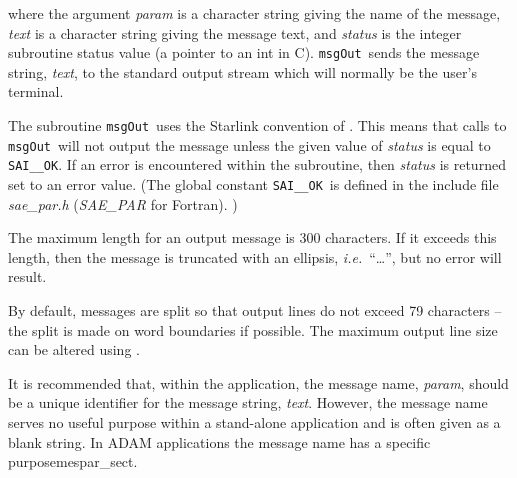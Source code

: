 \documentclass[twoside,11pt]{starlink}
\providecommand{\func}[1]{\texttt{#1}}
\providecommand{\farg}[1]{\textit{#1}}
\providecommand{\const}[1]{\texttt{#1}}
\providecommand{\fname}[1]{\textit{#1}}
\providecommand{\saiok}{\const{SAI\_\_OK}}
\providecommand{\msgout}{\func{msgOut}}
\begin{document}
where the argument \farg{param} is a character string giving the name of the message,
\farg{text} is a character string giving the message text, and \farg{status} is the
integer subroutine status value (a pointer to an int in C).
\msgout\ sends the message string, \farg{text}, to the
standard output stream which will normally be the user's terminal.

The subroutine \msgout\ uses the Starlink convention of
.
This means that calls to \msgout\ will not output the message unless the
given value of \farg{status} is equal to \saiok.
If an error is encountered within the subroutine, then \farg{status} is returned
set to an error value.
(The global constant \saiok\ is defined in the include file
\fname{sae\_par.h} (\fname{SAE\_PAR} for Fortran).
)

The maximum length for an output message is 300 characters.
If it exceeds this length, then the message is truncated with
an ellipsis, \textit{i.e.}\ ``\ldots'', but no error will result.

By default, messages are split so that output lines do not exceed
79 characters -- the split is made on word boundaries if possible.
The maximum output line size can be altered using
.

It is recommended that,
within the application, the message name, \farg{param}, should be a unique identifier
for the message string, \farg{text}.
However, the message name serves no useful purpose within a stand-alone
application and is often given as a blank string.
In ADAM applications the message name has a
\htmlref
{specific purpose}{mespar_sect}.
\end{document}
